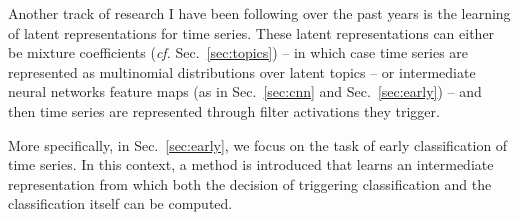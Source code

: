 Another track of research I have been following over the past years is the
learning of latent representations for time series.
These latent representations can either be mixture coefficients
(\emph{cf.} Sec.~\ref{sec:topics}) -- in which case time series are
represented as multinomial distributions over latent topics -- or intermediate
neural networks feature maps (as in Sec.~\ref{sec:cnn} and
Sec.~\ref{sec:early}) -- and then time series are represented through
filter activations they trigger.

More specifically, in Sec.~\ref{sec:early}, we focus on the task of early
classification of time series. In this context, a method is introduced that
learns an intermediate representation from which both the decision of
triggering classification and the classification itself can be computed.





